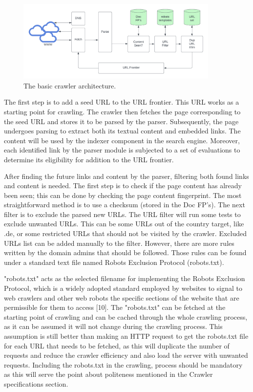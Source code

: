 \begin{figure}[h]	
     \centering
     \includegraphics[width=10cm]{images/crawler_architecture.png}
     \caption{The basic crawler architecture.}
     \label{fig:google-arch}
\end{figure}

The first step is to add a seed URL to the URL frontier. This URL works as a starting point for crawling. The crawler then fetches the page corresponding to the seed URL and stores it to be parsed by the parser. Subsequently, the page undergoes parsing to extract both its textual content and embedded links. The content will be used by the indexer component in the search engine. Moreover, each identified link by the parser module is subjected to a set of evaluations to determine its eligibility for addition to the URL frontier.

After finding the future links and content by the parser, filtering both found links and content is needed. The first step is to check if the page content has already been seen; this can be done by checking the page content fingerprint. The most straightforward method is to use a checksum (stored in the Doc FP's). The next filter is to exclude the parsed new URLs. The URL filter will run some tests to exclude unwanted URLs. This can be some URLs out of the country target, like .de, or some restricted URLs that should not be visited by the crawler. Excluded URLs list can be added manually to the filter. However, there are more rules written by the domain admins that should be followed. Those rules can be found under a standard text file named Robots Exclusion Protocol (robots.txt). 

"robots.txt" acts as the selected filename for implementing the Robots Exclusion Protocol, which is a widely adopted standard employed by websites to signal to web crawlers and other web robots the specific sections of the website that are permissible for them to access [10]. The "robots.txt" can be fetched at the starting point of crawling and can be cached through the whole crawling process, as it can be assumed it will not change during the crawling process. This assumption is still better than making an HTTP request to get the robots.txt file for each URL that needs to be fetched, as this will duplicate the number of requests and reduce the crawler efficiency and also load the server with unwanted requests. Including the robots.txt in the crawling, process should be mandatory as this will serve the point about politeness mentioned in the Crawler specifications section. 

